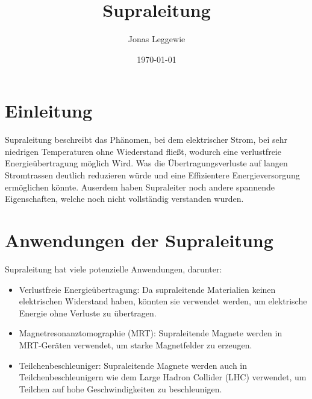 \documentclass[a4paper]{scrartcl}
\title{Supraleitung}
\author{Jonas Leggewie}
\date{\today}
\begin{document}
\maketitle
\newpage
\tableofcontents
\newpage


\section{Einleitung}
Supraleitung beschreibt das Phänomen, bei dem elektrischer Strom, bei sehr niedrigen Temperaturen 
ohne Wiederstand fließt, wodurch eine verlustfreie Energieübertragung möglich Wird. Was die 
Übertragungsverluste auf langen Stromtrassen deutlich reduzieren würde und eine Effizientere 
Energieversorgung ermöglichen könnte. Auserdem haben Supraleiter noch andere spannende 
Eigenschaften, welche noch nicht vollständig verstanden wurden. 



\newpage













\section{Anwendungen der Supraleitung}
Supraleitung hat viele potenzielle Anwendungen, darunter:
\begin{itemize}
    \item Verlustfreie Energieübertragung: Da supraleitende Materialien keinen elektrischen Widerstand haben, 
    könnten sie verwendet werden, um elektrische Energie ohne Verluste zu übertragen.
    \item Magnetresonanztomographie (MRT): Supraleitende Magnete werden in \\ MRT-Geräten verwendet, um starke 
    Magnetfelder zu erzeugen.
    \item Teilchenbeschleuniger: Supraleitende Magnete werden auch in Teilchenbeschleunigern wie dem Large 
    Hadron Collider (LHC) verwendet, um Teilchen auf hohe Geschwindigkeiten zu beschleunigen.
\end{itemize}


\end{document}

